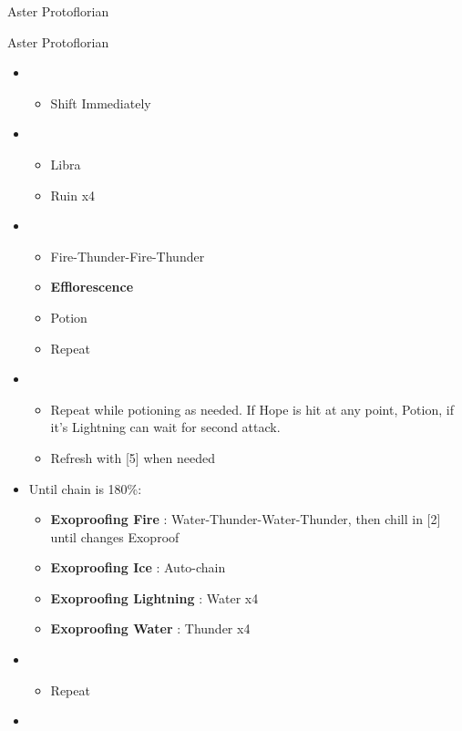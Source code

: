 \begin{paracol}{2}
\begin{battle}{Aster Protoflorian}
	\end{battle}
	\switchcolumn
	\begin{battle}{Aster Protoflorian}
		\begin{itemize}
			\item \first
			      \begin{itemize}
				      \item Shift Immediately
			      \end{itemize}
			\item \third
			      \begin{itemize}
				      \item Libra
				      \item Ruin x4
			      \end{itemize}
			\item \fourth
			      \begin{itemize}
				      \item Fire-Thunder-Fire-Thunder
				      \item \textbf{Efflorescence}
				      \item Potion
				      \item Repeat
			      \end{itemize}
			\item \fourth
			      \begin{itemize}
				      \item Repeat while potioning as needed. If Hope is hit at any point, Potion, if it's Lightning can wait for second attack.
				      \item Refresh with [5] when needed
			      \end{itemize}
			\item Until chain is 180\%:
			      \begin{itemize}
				      \item \textbf{Exoproofing Fire} : Water-Thunder-Water-Thunder, then chill in [2] until changes Exoproof
				      \item \textbf{Exoproofing Ice} : Auto-chain
				      \item \textbf{Exoproofing Lightning} : Water x4
				      \item \textbf{Exoproofing Water} : Thunder x4
			      \end{itemize}
			\item \second
			      \begin{itemize}
				      \item Repeat
			      \end{itemize}
			\item \fourth

\end{itemize}
\end{battle}
\end{paracol}
